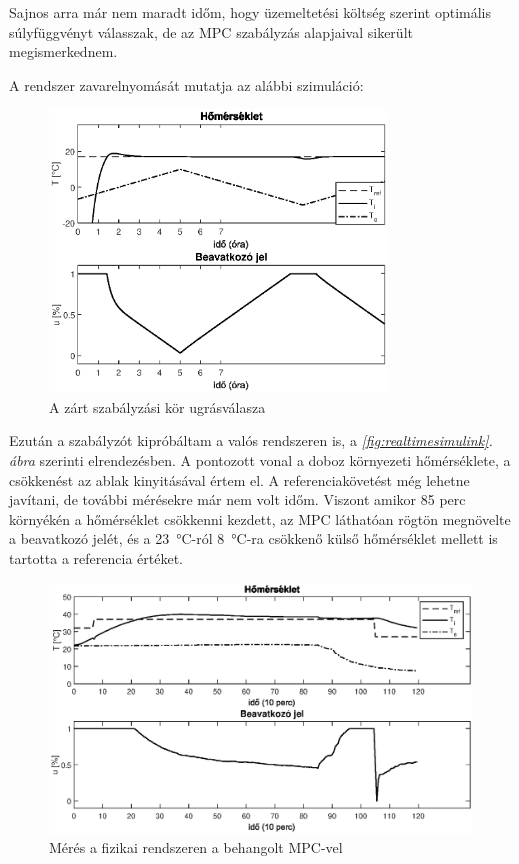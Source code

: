 Sajnos arra már nem maradt időm, hogy üzemeltetési költség szerint optimális súlyfüggvényt válasszak, de az MPC szabályzás alapjaival sikerült megismerkednem. 
\pagebreak

A rendszer zavarelnyomását mutatja az alábbi szimuláció:

\begin{figure}[H]
	\centering
	\includegraphics[width=0.8\textwidth]{figures/simscape/distrej}
	\caption{A zárt szabályzási kör ugrásválasza}
	\label{fig:mpc-distrej}
\end{figure}

Ezután a szabályzót kipróbáltam a valós rendszeren is, a \textit{\ref{fig:realtimesimulink}. ábra} szerinti elrendezésben. A pontozott vonal a doboz környezeti hőmérséklete, a csökkenést az ablak kinyitásával értem el. A referenciakövetést még lehetne javítani, de további mérésekre már nem volt időm. Viszont amikor 85 perc környékén a hőmérséklet csökkenni kezdett, az MPC láthatóan rögtön megnövelte a beavatkozó jelét, és a \SI{23}{\degreeCelsius}-ról \SI{8}{\degreeCelsius}-ra csökkenő külső hőmérséklet mellett is tartotta a referencia értéket.

\begin{figure}[H]
	\centering
	\includegraphics[width=\textwidth]{figures/realsys/step}
	\caption{Mérés a fizikai rendszeren a behangolt MPC-vel}
	\label{fig:mpc-step}
\end{figure}



